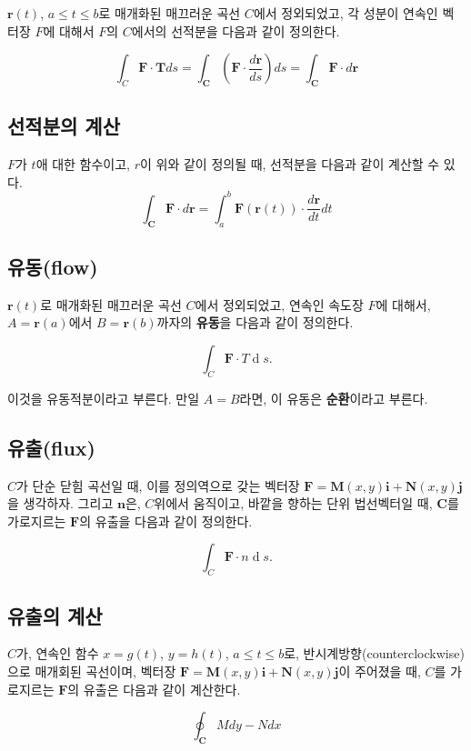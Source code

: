 \documentclass[chapter, oneside]{oblivoir}
\newcommand{\dx}[1]{\operatorname{d}\! #1}
\newcommand{\term}[1]{\textbf{#1}}
\begin{document}
$\textbf{r}(t)$, $a \le t \le b$로 매개화된 매끄러운 곡선 $C$에서 정외되었고, 각 성분이 연속인 벡터장 $F$에 대해서 $F$의  $C$에서의 선적분을 다음과 같이 정의한다.

$$ \int_{C} \textbf{F} \cdot \textbf{T} ds = \int_{\textbf{C}} \left( \textbf{F} \cdot \frac{d \textbf{r}}{ds} \right) ds = \int_{\textbf{C}} \textbf{F} \cdot d\textbf{r}$$


\subsection{선적분의 계산}
$F$가 $t$애 대한 함수이고, $r$이 위와 같이 정의될 때, 선적분을 다음과 같이 계산할 수 있다.
$$ \int_{\textbf{C}} \textbf{F} \cdot d\textbf{r} = \int_a^b \textbf{F}(\textbf{r}(t)) \cdot \frac{d\textbf{r}}{dt} dt $$


\subsection{유동(flow)}
$\textbf{r}(t)$로 매개화된 매끄러운 곡선 $C$에서 정외되었고, 연속인 속도장 $F$에 대해서, $A=\textbf{r}(a)$에서 $B=\textbf{r}(b)$까자의 \term{유동}을 다음과 같이 정의한다.

$$ \int _{C} \textbf{F} \cdot {T} \dx{s}.$$

이것을 유동적분이라고 부른다. 만일 $A=B$라면, 이 유동은 \term{순환}이라고 부른다. 


\subsection{유출(flux)}
$C$가 단순 닫힘 곡선일 때, 이를 정의역으로 갖는 벡터장 $\textbf{F}  = \textbf{M}(x,y)\textbf{i} + \textbf{N}(x,y)\textbf{j}$을 생각하자. 그리고 $\textbf{n}$은, $C$위에서 움직이고, 바깥을 향하는 단위 법선벡터일 때, $\textbf{C}$를 가로지르는 $\textbf{F}$의 유출을 다음과 같이 정의한다.

$$ \int _{C} \textbf{F} \cdot {n} \dx{s}.$$



\subsection{유출의 계산}
$C$가, 연속인 함수 $x=g(t)$, $y=h(t)$, $a \le t \le b$로, 반시계방향(counterclockwise)으로 매개회된 곡선이며, 
벡터장 $\textbf{F}  = \textbf{M}(x,y)\textbf{i} + \textbf{N}(x,y)\textbf{j}$이 주어졌을 때,
$C$를 가로지르는 $\textbf{F} $의 유출은 다음과 같이 계산한다.

$$\oint_{\textbf{C}} M dy - N dx$$
\end{document}
